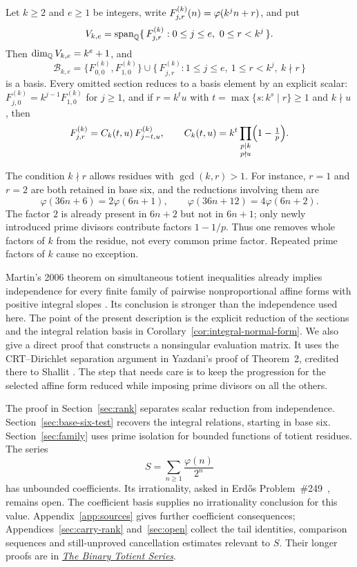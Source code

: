\documentclass[11pt]{article}
\newcommand{\longrecord}[2]{\href{erdos249-totient-reasoning-surface.pdf\##1}{#2}}
\begin{document}
\begin{theorem}
\label{thm:kkernelrank}
Let $k\ge2$ and $e\ge1$ be integers, write $F^{(k)}_{j,r}(n)=\varphi(k^jn+r)$, and put
\[
 V_{k,e}=\operatorname{span}_{\mathbb{Q}}
 \{\,F^{(k)}_{j,r}:0\le j\le e,\ 0\le r<k^j\,\}.
\]
Then $\dim_{\mathbb{Q}}V_{k,e}=k^e+1$, and
\[
 \mathcal B_{k,e}
 =\{F^{(k)}_{0,0},F^{(k)}_{1,0}\}
 \cup\{\,F^{(k)}_{j,r}:1\le j\le e,\ 1\le r<k^j,\ k\nmid r\,\}
\]
is a basis.  Every omitted section reduces to a basis element by an explicit
scalar: $F^{(k)}_{j,0}=k^{j-1}F^{(k)}_{1,0}$ for $j\ge1$, and if $r=k^tu$ with
$t=\max\{s:k^s\mid r\}\ge1$ and $k\nmid u$, then
\[
 F^{(k)}_{j,r}=C_k(t,u)\,F^{(k)}_{j-t,u},
 \qquad
 C_k(t,u)=k^t\prod_{\substack{p\mid k\\ p\nmid u}}\Bigl(1-\tfrac1p\Bigr).
\]
\end{theorem}

The condition $k\nmid r$ allows residues with $\gcd(k,r)>1$.
For instance, $r=1$ and $r=2$ are both retained in base six, and the
reductions involving them are
\[
 \varphi(36n+6)=2\varphi(6n+1),\qquad
 \varphi(36n+12)=4\varphi(6n+2).
\]
The factor $2$ is already present in $6n+2$ but not in $6n+1$;
only newly introduced prime divisors contribute factors $1-1/p$.
Thus one removes whole factors of $k$ from the residue, not every
common prime factor. Repeated prime factors of $k$ cause no exception.

Martin's 2006 theorem on simultaneous totient inequalities already
implies independence for every finite family of pairwise
nonproportional affine forms with positive integral slopes
\cite[Thm.~1]{martin-phi-inequalities}. Its conclusion is stronger
than the independence used here. The point of the present description
is the explicit reduction of the sections and the integral relation
basis in Corollary~\ref{cor:integral-normal-form}.
We also give a direct proof that constructs a nonsingular evaluation
matrix. It uses the CRT--Dirichlet separation argument in Yazdani's
proof of Theorem~2, credited there to Shallit
\cite[pp.~652--653]{yazdani2001}. The step that needs care is to keep
the progression for the selected affine form reduced while imposing
prime divisors on all the others.

The proof in Section~\ref{sec:rank} separates scalar reduction from
independence. Section~\ref{sec:base-six-test} recovers the integral
relations, starting in base six. Section~\ref{sec:family} uses prime
isolation for bounded functions of totient residues.
The series
\[
 S=\sum_{n\ge1}\frac{\varphi(n)}{2^n}
\]
has unbounded coefficients. Its irrationality, asked in
Erd\H{o}s Problem~\#249~\cite[p.~61]{erdosgraham1980}, remains open.
The coefficient basis supplies no irrationality conclusion for this
value. Appendix~\ref{app:sources} gives further coefficient
consequences; Appendices~\ref{sec:carry-rank} and~\ref{sec:open}
collect the tail identities, comparison sequences and still-unproved
cancellation estimates relevant to $S$. Their longer proofs are in
\longrecord{long249-r3-complements}{\emph{The Binary Totient Series}}.
\end{document}
